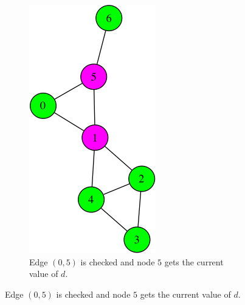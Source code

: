 \begin{figure}
\begin{subfigure}{0.20\textwidth}
\end{subfigure}
\hspace*{\fill} %
\begin{subfigure}{0.20\textwidth}
\includegraphics[width=\linewidth]{images/coloring/2.png}
\caption{Edge $(0,5)$ is checked and node $5$ gets the current value of $d$.} \label{fig:coloring2}

\end{subfigure}
\end{figure}
